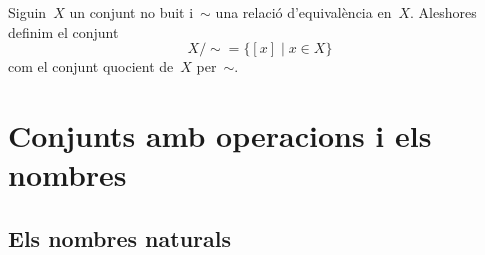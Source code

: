 \documentclass[../../main.tex]{subfiles}
\begin{document}
    \begin{definition}
        \label{def:conjunt quocient}
        Siguin~\(X\) un conjunt no buit i~\(\sim\) una relació d'equivalència en~\(X\).
        Aleshores definim el conjunt
        \[
            X/\sim=\{[x]\mid x\in X\}
        \]
        com el conjunt quocient de~\(X\) per~\(\sim\).
    \end{definition}
\chapter{Conjunts amb operacions i els nombres}
\section{Els nombres naturals}
\end{document}
